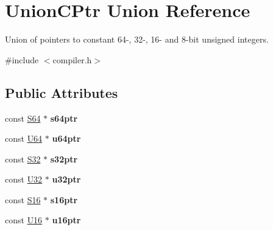 \hypertarget{union_union_c_ptr}{\section{Union\-C\-Ptr Union Reference}
\label{union_union_c_ptr}
}


Union of pointers to constant 64-\/, 32-\/, 16-\/ and 8-\/bit unsigned integers.  




{\ttfamily \#include $<$compiler.\-h$>$}

\subsection*{Public Attributes}
\begin{DoxyCompactItemize}
\item 
\hypertarget{union_union_c_ptr_a43192511976f0a6d92b0132aa0cb70f2}{const \hyperlink{group__group__xmega__utils_ga1d293e5c494dd6826239b02f5fe98e7f}{S64} $\ast$ {\bfseries s64ptr}}\label{union_union_c_ptr_a43192511976f0a6d92b0132aa0cb70f2}

\item 
\hypertarget{union_union_c_ptr_a4a6cf88c8245ebf428b70955b6f07660}{const \hyperlink{group__group__xmega__utils_ga25809e0734a149248fcf5831efa4e33d}{U64} $\ast$ {\bfseries u64ptr}}\label{union_union_c_ptr_a4a6cf88c8245ebf428b70955b6f07660}

\item 
\hypertarget{union_union_c_ptr_abef0d7044879e7cb955fc9c03cfb8f50}{const \hyperlink{group__group__xmega__utils_ga39c786017723555afb9e8b85accec0de}{S32} $\ast$ {\bfseries s32ptr}}\label{union_union_c_ptr_abef0d7044879e7cb955fc9c03cfb8f50}

\item 
\hypertarget{union_union_c_ptr_a4b439b888a79a28b144f009592b65acf}{const \hyperlink{group__group__xmega__utils_ga696390429f2f3b644bde8d0322a24124}{U32} $\ast$ {\bfseries u32ptr}}\label{union_union_c_ptr_a4b439b888a79a28b144f009592b65acf}

\item 
\hypertarget{union_union_c_ptr_a2cf792c052a8b758d4f577abb68b6da3}{const \hyperlink{group__group__xmega__utils_ga6d241ad21a823c90d4835380787db5d4}{S16} $\ast$ {\bfseries s16ptr}}\label{union_union_c_ptr_a2cf792c052a8b758d4f577abb68b6da3}

\item 
\hypertarget{union_union_c_ptr_a0937efe8d164fef35cc8f910374dd7f0}{const \hyperlink{group__group__xmega__utils_ga0a0a322d5fa4a546d293a77ba8b4a71f}{U16} $\ast$ {\bfseries u16ptr}}\label{union_union_c_ptr_a0937efe8d164fef35cc8f910374dd7f0}


\end{DoxyCompactItemize}

